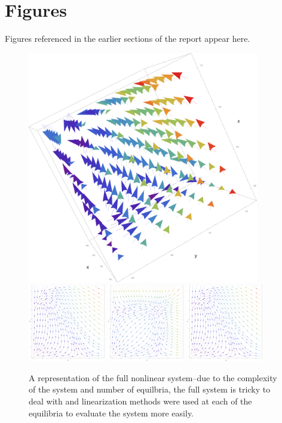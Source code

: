 \documentclass[10pt]{article}
\newcommand{\np}{\vfill\newpage}
\begin{document}
\section*{Figures}
Figures referenced in the earlier sections of the report appear here.
\np
\begin{figure}[h!]
\centering
\includegraphics[width=0.9\textwidth]{full3d.png} \\
\includegraphics[width=0.3\textwidth]{fullxy.png}
\includegraphics[width=0.3\textwidth]{fullxz.png}
\includegraphics[width=0.3\textwidth]{fullyz.png}
\caption{A representation of the full nonlinear system--due to the complexity of the system and number of equilbria, the full system is tricky to deal with and linearization methods were used at each of the equilibria to evaluate the system more easily.}
\label{fig:fullplot}
\end{figure}
\end{document}
